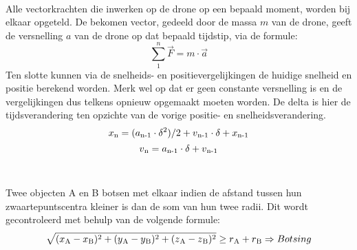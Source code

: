 \\
Alle vectorkrachten die inwerken op de drone op een bepaald moment, worden bij elkaar opgeteld. De bekomen vector, gedeeld door de massa \(m\) van de drone, geeft de versnelling \(a\) van de drone op dat bepaald tijdstip, via de formule:
\\
\begin{equation*}
\sum_{1}^{n} \vec{F} = m \cdot \vec{a} \label{krachtenevenwicht}
\end{equation*}
Ten slotte kunnen via de snelheids- en positievergelijkingen de huidige snelheid en positie berekend worden. Merk wel op dat er geen constante versnelling is en de vergelijkingen dus telkens opnieuw opgemaakt moeten worden. De delta is hier de tijdsverandering ten opzichte van de vorige positie- en snelheidsverandering.
\\
\begin{equation*}
x\textsubscript{n} = (a\textsubscript{n-1} \cdot \delta\textsuperscript{2})/2 + v\textsubscript{n-1} \cdot \delta + x\textsubscript{n-1} \label{positie}
\end{equation*}
\begin{equation*}
v\textsubscript{n} = a\textsubscript{n-1} \cdot \delta + v\textsubscript{n-1} \label{snelheid}
\end{equation*}
\\
\\
Twee objecten A en B botsen met elkaar indien de afstand tussen hun zwaartepuntscentra kleiner is dan de som van hun twee radii. Dit wordt gecontroleerd met behulp van de volgende formule:
\begin{equation*}
\sqrt{(x\textsubscript{A}-x\textsubscript{B})\textsuperscript{2} + (y\textsubscript{A} - y\textsubscript{B})\textsuperscript{2} + (z\textsubscript{A} - z\textsubscript{B})\textsuperscript{2}}  \ge r\textsubscript{A} + r\textsubscript{B} \Rightarrow Botsing
\end{equation*}
\\
\\
